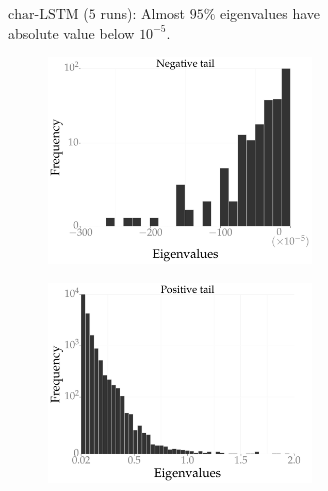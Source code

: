 \documentclass[10pt]{article}
\newcommand{\charlstm}{\textrm{char-LSTM}}
\begin{document}
\begin{figure}[!tbh]
\begin{subfigure}[t]{0.4 \textwidth}
        \caption{\small $\charlstm$ ($5$ runs): Almost $95\%$ eigenvalues have absolute value below $10^{-5}$.}
        \label{fig:charlstm_hessian}
    \end{subfigure}
    \begin{subfigure}[b]{\textwidth}
        \centering
        \begin{subfigure}[b]{0.4 \textwidth}
        \includegraphics[width=\textwidth]{allcnn_dm.pdf}
        \end{subfigure}
        \hspace{0.2in}
        \begin{subfigure}[b]{0.4 \textwidth}
        \includegraphics[width=\textwidth]{allcnn_dp.pdf}

\end{subfigure}
\end{subfigure}
\end{figure}
\end{document}
